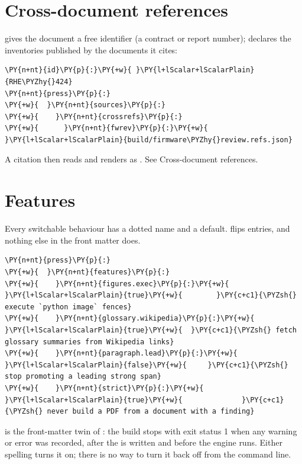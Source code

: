 \documentclass[a4paper,twoside]{article}
\begin{document}
\section{Cross-document references}
 gives the document a free identifier (a contract or report number);
 declares the inventories published by the documents it
cites:
\begin{tscode}[lang=yaml, engine=pygments]
\begin{Verbatim}[commandchars=\\\{\},breaklines, breakanywhere, commandchars=\\\{\}]
\PY{n+nt}{id}\PY{p}{:}\PY{+w}{ }\PY{l+lScalar+lScalarPlain}{RHE\PYZhy{}424}
\PY{n+nt}{press}\PY{p}{:}
\PY{+w}{  }\PY{n+nt}{sources}\PY{p}{:}
\PY{+w}{    }\PY{n+nt}{crossrefs}\PY{p}{:}
\PY{+w}{      }\PY{n+nt}{fwrev}\PY{p}{:}\PY{+w}{ }\PY{l+lScalar+lScalarPlain}{build/firmware\PYZhy{}review.refs.json}
\end{Verbatim}
\end{tscode}
A citation then reads  and renders as
. See Cross-document references.
\section{Features}
Every switchable behaviour has a dotted name and a default. 
flips entries, and nothing else in the front matter does.
\begin{tscode}[lang=yaml, engine=pygments]
\begin{Verbatim}[commandchars=\\\{\},breaklines, breakanywhere, commandchars=\\\{\}]
\PY{n+nt}{press}\PY{p}{:}
\PY{+w}{  }\PY{n+nt}{features}\PY{p}{:}
\PY{+w}{    }\PY{n+nt}{figures.exec}\PY{p}{:}\PY{+w}{ }\PY{l+lScalar+lScalarPlain}{true}\PY{+w}{        }\PY{c+c1}{\PYZsh{} execute `python image` fences}
\PY{+w}{    }\PY{n+nt}{glossary.wikipedia}\PY{p}{:}\PY{+w}{ }\PY{l+lScalar+lScalarPlain}{true}\PY{+w}{  }\PY{c+c1}{\PYZsh{} fetch glossary summaries from Wikipedia links}
\PY{+w}{    }\PY{n+nt}{paragraph.lead}\PY{p}{:}\PY{+w}{ }\PY{l+lScalar+lScalarPlain}{false}\PY{+w}{     }\PY{c+c1}{\PYZsh{} stop promoting a leading strong span}
\PY{+w}{    }\PY{n+nt}{strict}\PY{p}{:}\PY{+w}{ }\PY{l+lScalar+lScalarPlain}{true}\PY{+w}{              }\PY{c+c1}{\PYZsh{} never build a PDF from a document with a finding}
\end{Verbatim}
\end{tscode}
 is the front-matter twin of : the build stops with exit
status 1 when any warning or error was recorded, after the  is written
and before the engine runs. Either spelling turns it on; there is no way to
turn it back off from the command line.
\end{document}
